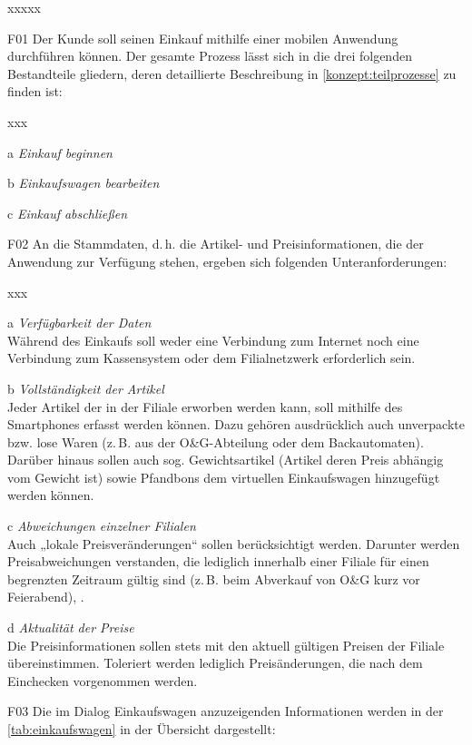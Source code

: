 \begin{seToplist}{xxxxx}
	\item[F01] Der Kunde soll seinen Einkauf mithilfe einer mobilen Anwendung durchführen können. Der gesamte Prozess lässt sich in die drei folgenden Bestandteile gliedern, deren detaillierte Beschreibung in \ref{konzept:teilprozesse} zu finden ist:
	\begin{seToplist}{xxx}
		\item[a]\textit{Einkauf beginnen}
		\item[b]\textit{Einkaufswagen bearbeiten}
		\item[c]\textit{Einkauf abschließen}
	\end{seToplist}
	\item[F02] An die Stammdaten, d.\,h. die Artikel- und Preisinformationen, die der Anwendung zur Verfügung stehen, ergeben sich folgenden Unteranforderungen:
	\begin{seToplist}{xxx}
		\item[a]\textit{Verfügbarkeit der Daten}\\
		Während des Einkaufs soll weder eine Verbindung zum Internet noch eine Verbindung zum Kassensystem oder dem Filialnetzwerk erforderlich sein.
		\item[b]\textit{Vollständigkeit der Artikel}\\
		Jeder Artikel der in der Filiale erworben werden kann, soll mithilfe des Smartphones erfasst werden können. Dazu gehören ausdrücklich auch unverpackte bzw. lose Waren (z.\,B. aus der O\&G-Abteilung oder dem Backautomaten). Darüber hinaus sollen auch sog. Gewichtsartikel (Artikel deren Preis abhängig vom Gewicht ist) sowie Pfandbons dem virtuellen Einkaufswagen hinzugefügt werden können.
		\item[c]\textit{Abweichungen einzelner Filialen}\\
		Auch „lokale Preisveränderungen“ sollen berücksichtigt werden. Darunter werden Preisabweichungen verstanden, die lediglich innerhalb einer Filiale für einen begrenzten Zeitraum gültig sind (z.\,B. beim Abverkauf von O\&G kurz vor Feierabend), .
		\item[d]\textit{Aktualität der Preise}\\
		Die Preisinformationen sollen stets mit den aktuell gültigen Preisen der Filiale übereinstimmen. Toleriert werden lediglich Preisänderungen, die nach dem Einchecken vorgenommen werden.
	\end{seToplist}
	\item[F03]Die im Dialog Einkaufswagen anzuzeigenden Informationen werden in der \ref{tab:einkaufswagen} in der Übersicht dargestellt:
	

\end{seToplist}
